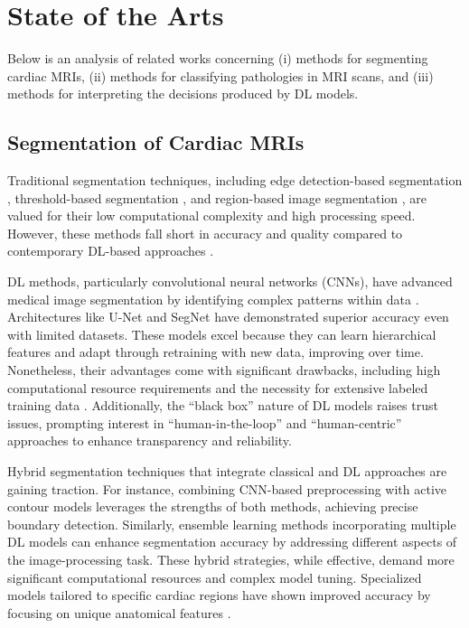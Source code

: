 \documentclass[fleqn,10pt]{wlscirep}
\begin{document}
\section*{State of the Arts}

Below is an analysis of related works concerning (i) methods for segmenting cardiac MRIs, (ii) methods for classifying pathologies in MRI scans, and (iii) methods for interpreting the decisions produced by DL models.

\subsection*{Segmentation of Cardiac MRIs}

Traditional segmentation techniques, including edge detection-based segmentation \cite{Zhao:2005}, threshold-based segmentation \cite{Xu:2010}, and region-based image segmentation \cite{Cigla:2008}, are valued for their low computational complexity and high processing speed. However, these methods fall short in accuracy and quality compared to contemporary DL-based approaches \cite{Liu:2021}.

DL methods, particularly convolutional neural networks (CNNs), have advanced medical image segmentation by identifying complex patterns within data \cite{Berezsky:2024}. Architectures like U-Net \cite{Ronneberger:2015} and SegNet \cite{Badrinarayanan:2017} have demonstrated superior accuracy even with limited datasets. These models excel because they can learn hierarchical features and adapt through retraining with new data, improving over time. Nonetheless, their advantages come with significant drawbacks, including high computational resource requirements and the necessity for extensive labeled training data \cite{Ankenbrand:2021}. Additionally, the “black box” nature of DL models raises trust issues, prompting interest in “human-in-the-loop” \cite{Radiuk:2022} and “human-centric” \cite{Singh:2025} approaches to enhance transparency and reliability.

Hybrid segmentation techniques that integrate classical and DL approaches are gaining traction. For instance, combining CNN-based preprocessing with active contour models leverages the strengths of both methods, achieving precise boundary detection. Similarly, ensemble learning methods incorporating multiple DL models can enhance segmentation accuracy by addressing different aspects of the image-processing task. These hybrid strategies, while effective, demand more significant computational resources and complex model tuning. Specialized models tailored to specific cardiac regions have shown improved accuracy by focusing on unique anatomical features \cite{Wehbe:2023}.
\end{document}
